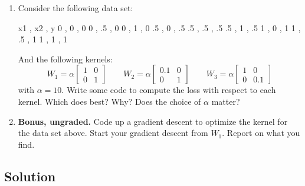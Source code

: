 \documentclass[submit]{harvardml}
\begin{document}
\begin{problem}
\begin{enumerate}
\item Consider the following data set:
\begin{csv}
x1 , x2 , y 
  0 , 0 , 0
  0 , .5 , 0
  0 , 1 , 0 
  .5 , 0 , .5
  .5 , .5 , .5
  .5 , 1 , .5
  1 , 0 , 1
  1 , .5 , 1
  1 , 1 , 1 
\end{csv}
And the following kernels:
\begin{equation*} 
W_1 = \alpha \begin{bmatrix}
  1 & 0 \\
  0 & 1 
\end{bmatrix}
\qquad
W_2 = \alpha \begin{bmatrix}
  0.1 & 0 \\
  0 & 1 
\end{bmatrix}
\qquad
W_3 = \alpha \begin{bmatrix}
  1 & 0 \\
  0 & 0.1 
\end{bmatrix}
\end{equation*} 
with $\alpha = 10$. Write some code to compute the loss with respect
to each kernel.  Which does best?  Why?  Does the choice of $\alpha$
matter? 


\item \textbf{Bonus, ungraded.}  Code up a gradient descent to
  optimize the kernel for the data set above.  Start your gradient
  descent from $W_1$.  Report on what you find.
  
\end{enumerate}

\end{problem}

\subsection*{Solution}
\end{document}
